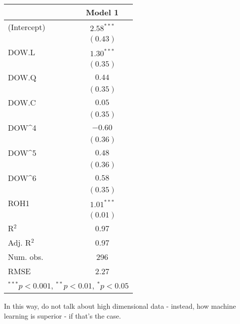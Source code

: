 \documentclass[]{article}
\begin{document}
\begin{tabular}{l c }
\hline
 & Model 1 \\
\hline
(Intercept) & $2.58^{***}$ \\
            & $(0.43)$     \\
DOW.L       & $1.30^{***}$ \\
            & $(0.35)$     \\
DOW.Q       & $0.44$       \\
            & $(0.35)$     \\
DOW.C       & $0.05$       \\
            & $(0.35)$     \\
DOW^4       & $-0.60$      \\
            & $(0.36)$     \\
DOW^5       & $0.48$       \\
            & $(0.36)$     \\
DOW^6       & $0.58$       \\
            & $(0.35)$     \\
ROH1        & $1.01^{***}$ \\
            & $(0.01)$     \\
\hline
R$^2$       & 0.97         \\
Adj. R$^2$  & 0.97         \\
Num. obs.   & 296          \\
RMSE        & 2.27         \\
\hline
\multicolumn{2}{l}{\scriptsize{$^{***}p<0.001$, $^{**}p<0.01$, $^*p<0.05$}}
\end{tabular}

In this way, do not talk about high dimensional data - instead, how
machine learning is superior - if that's the case.
\end{document}
